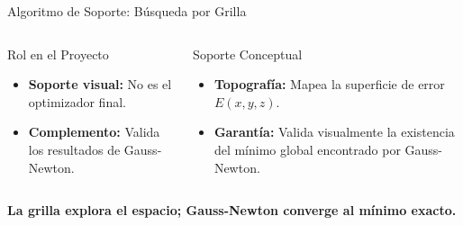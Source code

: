 \begin{frame}{Algoritmo de Soporte: Búsqueda por Grilla}
\begin{columns}[T]
        \begin{block}{Rol en el Proyecto}
            \scriptsize
            \begin{itemize}
                \item \textbf{Soporte visual:} No es el optimizador final.
                \vspace{0.1cm}
                \item \textbf{Complemento:} Valida los resultados de Gauss-Newton.
            \end{itemize}
        \end{block}

        \vspace{0.3cm}

        \begin{block}{Soporte Conceptual}
            \scriptsize
            \begin{itemize}
                \item \textbf{Topografía:} Mapea la superficie de error $E(x,y,z)$.
                \vspace{0.1cm}
                \item \textbf{Garantía:} Valida visualmente la existencia del mínimo global encontrado por Gauss-Newton.
            \end{itemize}
        \end{block}

    \end{columns}

    \vspace{0.2cm}
    \begin{center}
        \footnotesize
        \textbf{La grilla explora el espacio; Gauss-Newton converge al mínimo exacto.}
    \end{center}

\end{frame}